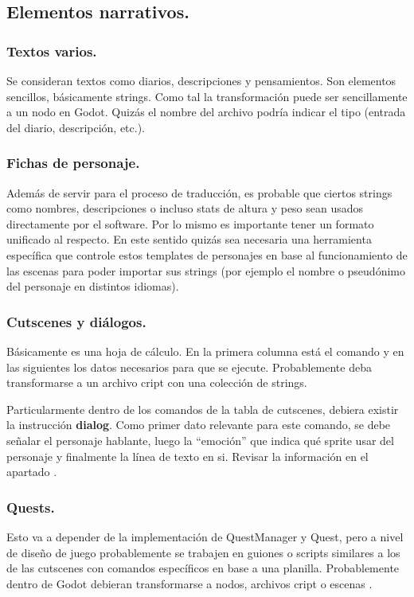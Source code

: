 \subsection{Elementos narrativos.}\label{kit:elementos-narrativos}

\subsubsection{Textos varios.}\label{kit:textos-varios}
Se consideran textos como diarios, descripciones y pensamientos. Son elementos sencillos, básicamente strings. Como tal la transformación puede ser sencillamente a un nodo en Godot. Quizás el nombre del archivo podría indicar el tipo (entrada del diario, descripción, etc.). 

\subsubsection{Fichas de personaje.}\label{kit:fichas-de-personaje}
Además de servir para el proceso de traducción, es probable que ciertos strings como nombres, descripciones o incluso stats de altura y peso sean usados directamente por el software. Por lo mismo es importante tener un formato unificado al respecto. En este sentido quizás sea necesaria una herramienta específica que controle estos templates de personajes en base al funcionamiento de las escenas para poder importar sus strings (por ejemplo el nombre o pseudónimo del personaje en distintos idiomas).

\subsubsection{Cutscenes y diálogos.}\label{kit:cutscenes-y-dialogos}
Básicamente es una hoja de cálculo. En la primera columna está el comando y en las siguientes los datos necesarios para que se ejecute. Probablemente deba transformarse a un archivo cript con una colección de strings.

Particularmente dentro de los comandos de la tabla de cutscenes, debiera existir la instrucción \textbf{dialog}. Como primer dato relevante para este comando, se debe señalar el personaje hablante, luego la “emoción” que indica qué sprite usar del personaje y finalmente la línea de texto en si. Revisar la información en el apartado .

\subsubsection{Quests.}\label{kit:quests}
Esto va a depender de la implementación de QuestManager y Quest, pero a nivel de diseño de juego probablemente se trabajen en guiones o scripts similares a los de las cutscenes con comandos específicos en base a una planilla. Probablemente dentro de Godot debieran transformarse a nodos, archivos cript o escenas .

